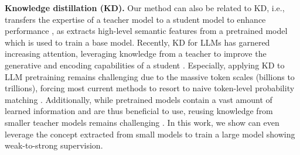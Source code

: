 \textbf{Knowledge distillation (KD).} 
Our method can also be related to KD, i.e., transfers the expertise of a teacher model to a student model to enhance performance \citep{hinton2015distilling,zagoruyko2017paying}, as \sname extracts high-level semantic features from a pretrained model which is used to train a base model. Recently, KD for LLMs has garnered increasing attention, leveraging knowledge from a teacher to improve the generative and encoding capabilities of a student \citep{sanh2019distilbert,ko2024distillm}. Especially, applying KD to LLM pretraining remains challenging due to the massive token scales (billions to trillions), forcing most current methods to resort to naive token-level probability matching  \citep{team2024gemma,gu2024miniplm}. Additionally, while pretrained models contain a vast amount of learned information and are thus beneficial to use, reusing knowledge from smaller teacher models remains challenging \citep{burns2023weak}. In this work, we show \sname can even leverage the concept extracted from small models to train a large model showing weak-to-strong supervision.